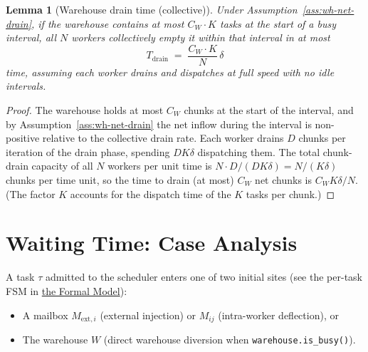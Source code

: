 \documentclass[11pt,a4paper]{article}
\newtheorem{lemma}[theorem]{Lemma}
\newcommand{\code}[1]{\texttt{#1}}
\begin{document}
\begin{lemma}[Warehouse drain time (collective)]
\label{lem:wdrain}
Under Assumption~\ref{ass:wh-net-drain}, if the warehouse contains at
most $C_W \cdot K$ tasks at the start of a busy interval, all $N$
workers collectively empty it within that interval in at most
\[
  T_{\mathrm{drain}} \;=\; \frac{C_W \cdot K}{N}\,\delta
\]
time, assuming each worker drains and dispatches at full speed with
no idle intervals.
\end{lemma}

\begin{proof}
The warehouse holds at most $C_W$ chunks at the start of the interval,
and by Assumption~\ref{ass:wh-net-drain} the net inflow during the
interval is non-positive relative to the collective drain rate. Each
worker drains $D$ chunks per iteration of the drain phase, spending
$DK\delta$ dispatching them.  The total chunk-drain capacity of all $N$
workers per unit time is $N \cdot D / (DK\delta) = N/(K\delta)$
chunks per time unit, so the time to drain (at most) $C_W$ net chunks
is $C_W K\delta / N$.  (The factor $K$ accounts for the dispatch
time of the $K$ tasks per chunk.)
\end{proof}

\section{Waiting Time: Case Analysis}

A task $\tau$ admitted to the scheduler enters one of two
initial sites (see the per-task FSM in \hyperref[chap:formal_model]{the Formal Model}):
\begin{itemize}
  \item A mailbox $M_{\text{ext},i}$ (external injection) or
        $M_{ij}$ (intra-worker deflection), or
  \item The warehouse $W$ (direct warehouse diversion when
        \code{warehouse.is\_busy()}).
\end{itemize}
\end{document}
